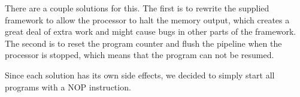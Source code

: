There are a couple solutions for this.
The first is to rewrite the supplied framework to allow the processor to halt the memory output, which creates a great deal of extra work and might cause bugs in other parts of the framework.
The second is to reset the program counter and flush the pipeline when the processor is stopped, which means that the program can not be resumed.

Since each solution has its own side effects, we decided to simply start all
programs with a NOP instruction.

